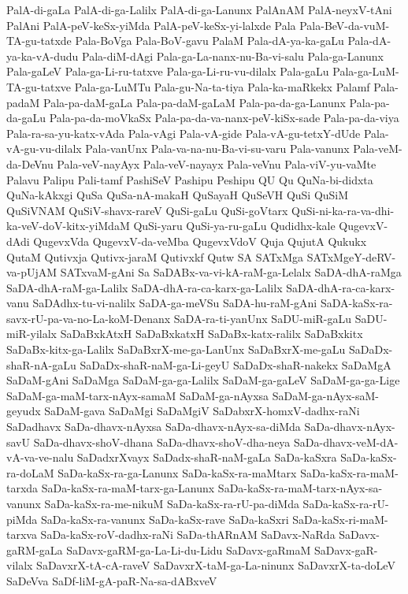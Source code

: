 {PalA-di-gaLa
PalA-di-ga-Lalilx
PalA-di-ga-Lanunx
PalAnAM
PalA-neyxV-tAni
PalAni
PalA-peV-keSx-yiMda
PalA-peV-keSx-yi-lalxde
Pala
Pala-BeV-da-vuM-TA-gu-tatxde
Pala-BoVga
Pala-BoV-gavu
PalaM
Pala-dA-ya-ka-gaLu
Pala-dA-ya-ka-vA-dudu
Pala-diM-dAgi
Pala-ga-La-nanx-nu-Ba-vi-salu
Pala-ga-Lanunx
Pala-gaLeV
Pala-ga-Li-ru-tatxve
Pala-ga-Li-ru-vu-dilalx
Pala-gaLu
Pala-ga-LuM-TA-gu-tatxve
Pala-ga-LuMTu
Pala-gu-Na-ta-tiya
Pala-ka-maRkekx
Palamf
Pala-padaM
Pala-pa-daM-gaLa
Pala-pa-daM-gaLaM
Pala-pa-da-ga-Lanunx
Pala-pa-da-gaLu
Pala-pa-da-moVkaSx
Pala-pa-da-va-nanx-peV-kiSx-sade
Pala-pa-da-viya
Pala-ra-sa-yu-katx-vAda
Pala-vAgi
Pala-vA-gide
Pala-vA-gu-tetxY-dUde
Pala-vA-gu-vu-dilalx
Pala-vanUnx
Pala-va-na-nu-Ba-vi-su-varu
Pala-vanunx
Pala-veM-da-DeVnu
Pala-veV-nayAyx
Pala-veV-nayayx
Pala-veVnu
Pala-viV-yu-vaMte
Palavu
Palipu
Pali-tamf
PashiSeV
Pashipu
Peshipu
QU
Qu
QuNa-bi-didxta
QuNa-kAkxgi
QuSa
QuSa-nA-makaH
QuSayaH
QuSeVH
QuSi
QuSiM
QuSiVNAM
QuSiV-shavx-rareV
QuSi-gaLu
QuSi-goVtarx
QuSi-ni-ka-ra-va-dhi-ka-veV-doV-kitx-yiMdaM
QuSi-yaru
QuSi-ya-ru-gaLu
Qudidhx-kale
QugevxV-dAdi
QugevxVda
QugevxV-da-veMba
QugevxVdoV
Quja
QujutA
Qukukx
QutaM
Qutivxja
Qutivx-jaraM
Qutivxkf
Qutw
SA
SATxMga
SATxMgeY-deRV-va-pUjAM
SATxvaM-gAni
Sa
SaDABx-va-vi-kA-raM-ga-Lelalx
SaDA-dhA-raMga
SaDA-dhA-raM-ga-Lalilx
SaDA-dhA-ra-ca-karx-ga-Lalilx
SaDA-dhA-ra-ca-karx-vanu
SaDAdhx-tu-vi-nalilx
SaDA-ga-meVSu
SaDA-hu-raM-gAni
SaDA-kaSx-ra-savx-rU-pa-va-no-La-koM-Denanx
SaDA-ra-ti-yanUnx
SaDU-miR-gaLu
SaDU-miR-yilalx
SaDaBxkAtxH
SaDaBxkatxH
SaDaBx-katx-ralilx
SaDaBxkitx
SaDaBx-kitx-ga-Lalilx
SaDaBxrX-me-ga-LanUnx
SaDaBxrX-me-gaLu
SaDaDx-shaR-nA-gaLu
SaDaDx-shaR-naM-ga-Li-geyU
SaDaDx-shaR-nakekx
SaDaMgA
SaDaM-gAni
SaDaMga
SaDaM-ga-ga-Lalilx
SaDaM-ga-gaLeV
SaDaM-ga-ga-Lige
SaDaM-ga-maM-tarx-nAyx-samaM
SaDaM-ga-nAyxsa
SaDaM-ga-nAyx-saM-geyudx
SaDaM-gava
SaDaMgi
SaDaMgiV
SaDabxrX-homxV-dadhx-raNi
SaDadhavx
SaDa-dhavx-nAyxsa
SaDa-dhavx-nAyx-sa-diMda
SaDa-dhavx-nAyx-savU
SaDa-dhavx-shoV-dhana
SaDa-dhavx-shoV-dha-neya
SaDa-dhavx-veM-dA-vA-va-ve-nalu
SaDadxrXvayx
SaDadx-shaR-naM-gaLa
SaDa-kaSxra
SaDa-kaSx-ra-doLaM
SaDa-kaSx-ra-ga-Lanunx
SaDa-kaSx-ra-maMtarx
SaDa-kaSx-ra-maM-tarxda
SaDa-kaSx-ra-maM-tarx-ga-Lanunx
SaDa-kaSx-ra-maM-tarx-nAyx-sa-vanunx
SaDa-kaSx-ra-me-nikuM
SaDa-kaSx-ra-rU-pa-diMda
SaDa-kaSx-ra-rU-piMda
SaDa-kaSx-ra-vanunx
SaDa-kaSx-rave
SaDa-kaSxri
SaDa-kaSx-ri-maM-tarxva
SaDa-kaSx-roV-dadhx-raNi
SaDa-thARnAM
SaDavx-NaRda
SaDavx-gaRM-gaLa
SaDavx-gaRM-ga-La-Li-du-Lidu
SaDavx-gaRmaM
SaDavx-gaR-vilalx
SaDavxrX-tA-cA-raveV
SaDavxrX-taM-ga-La-ninunx
SaDavxrX-ta-doLeV
SaDeVva
SaDf-liM-gA-paR-Na-sa-dABxveV
}
